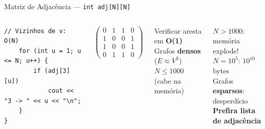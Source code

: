 \documentclass[aspectratio=169,10pt]{beamer}
\begin{document}
\begin{frame}[fragile]{Matriz de Adjacência --- \texttt{int adj[N][N]}}
\begin{columns}[t]
\begin{tcolorbox}[caixaCodigo]
\begin{lstlisting}[style=cppstyle]
    // Vizinhos de v: O(N)
    for (int u = 1; u <= N; u++) {
        if (adj[3][u])
            cout << "3 -> " << u << "\n";
    }
}
        \end{lstlisting}
      \end{tcolorbox}
      \centering
      \begin{tcolorbox}[caixaAzul,title={Matriz para o grafo}]
        \centering\footnotesize
        \quad
        $\begin{pmatrix}
          0 & 1 & 1 & 0\\
          1 & 0 & 0 & 1\\
          1 & 0 & 0 & 1\\
          0 & 1 & 1 & 0
        \end{pmatrix}$
      \end{tcolorbox}
      \vspace{0.07cm}
      \begin{tcolorbox}[caixaVerde,title={Quando usar}]
        \footnotesize
        Verificar aresta em \textbf{O(1)}\\
        Grafos \textbf{densos} ($E \approx V^2$)\\
        $N \leq 1000$ (cabe na memória)
      \end{tcolorbox}
      \vspace{0.07cm}
      \begin{tcolorbox}[caixaVermelho,title={Quando NÃO usar}]
        \footnotesize
        $N > 1000$: memória explode!\\
        $N = 10^5$: $10^{10}$ bytes \texttimes\\[2pt]
        Grafos \textbf{esparsos}: desperdício\\
        \textbf{Prefira lista de adjacência}
      \end{tcolorbox}
  \end{columns}
\end{frame}
\end{document}
